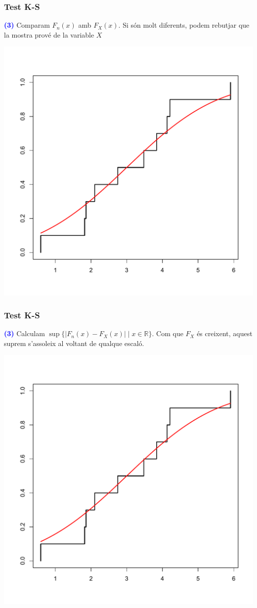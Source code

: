 \documentclass[12pt,t]{beamer}
\newcommand{\blue}[1]{\textcolor{blue}{#1}}
\newcommand{\RR}{\mathbb{R}}
\theoremstyle{plain}
\theoremstyle{definition}
\begin{document}
\begin{frame}
\frametitle{Test K-S}

\blue{\bf (3)} Comparam $F_n(x)$ amb $F_X(x)$. Si són molt diferents, 
podem rebutjar que la mostra prové de la variable $X$
\vspace*{-3ex}

\begin{center}
\includegraphics[width=0.7\linewidth]{KS}
\end{center}

\end{frame}



\begin{frame}
\frametitle{Test K-S}

\blue{\bf (3)} Calculam $\sup\{|F_n(x)-F_X(x)|\mid x\in \RR\}$. Com que $F_X$ és creixent, aquest suprem s'assoleix al voltant de qualque escaló.
\vspace*{-3ex}

\begin{center}
\includegraphics[width=0.7\linewidth]{KS}
\end{center}

\end{frame}
\end{document}
